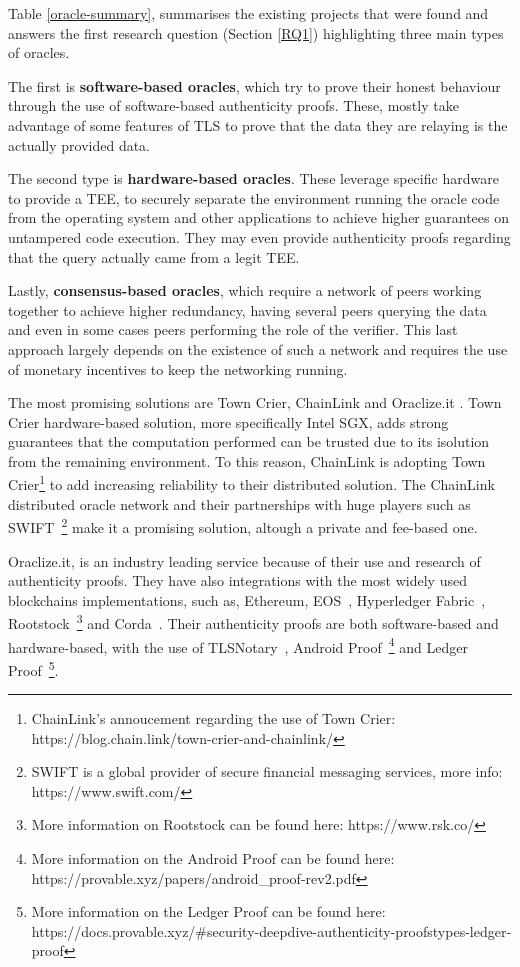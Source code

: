 \documentclass[final,3p,12pt,twocolumn]{elsarticle}
\begin{document}
Table \ref{oracle-summary}, summarises the existing projects that were found and answers the first research question (Section \ref{RQ1}) highlighting three main types of oracles.


The first is \textbf{software-based oracles}, which try to prove their honest behaviour through the use of software-based authenticity proofs. These, mostly take advantage of some features of TLS to prove that the data they are relaying is the actually provided data.

The second type is \textbf{hardware-based oracles}. These leverage specific hardware to provide a TEE, to securely separate the environment running the oracle code from the operating system and other applications to achieve higher guarantees on untampered code execution. They may even provide authenticity proofs regarding that the query actually came from a legit TEE.

Lastly, \textbf{consensus-based oracles}, which require a network of peers working together to achieve higher redundancy, having several peers querying the data and even in some cases peers performing the role of the verifier. This last approach largely depends on the existence of such a network and requires the use of monetary incentives to keep the networking running.

The most promising solutions are Town Crier, ChainLink and Oraclize.it .  Town Crier hardware-based solution, more specifically Intel SGX, adds strong guarantees that the computation performed can be trusted due to its isolution from the remaining environment. To this reason, ChainLink is adopting Town Crier\footnote{ChainLink's annoucement regarding the use of Town Crier: https://blog.chain.link/town-crier-and-chainlink/} to add increasing reliability to their distributed solution. The ChainLink distributed oracle network and their partnerships with huge players such as SWIFT~\footnote{SWIFT is a global provider
  of secure financial messaging services, more info: https://www.swift.com/} make it a promising solution, altough a private and fee-based one.

Oraclize.it, is an industry leading service because of their use and research of authenticity proofs. They have also integrations with the most widely used blockchains implementations, such as, Ethereum, EOS~\cite{Block.one2018}, Hyperledger Fabric~\cite{Androulaki}, Rootstock~\footnote{More information on Rootstock can be found here: https://www.rsk.co/} and Corda~\cite{Brown2016}. Their authenticity proofs are both software-based and hardware-based, with the use of TLSNotary~\cite{TLSnotary}, Android Proof~\footnote{More information on the Android Proof can be found here: https://provable.xyz/papers/android\_proof-rev2.pdf} and Ledger Proof~\footnote{More information on the Ledger Proof can be found here: https://docs.provable.xyz/\#security-deepdive-authenticity-proofstypes-ledger-proof}.
\end{document}
